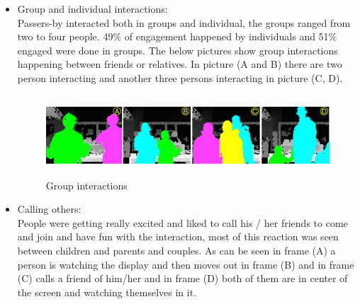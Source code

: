 \begin{enumerate}
\begin{itemize}
\item Group and individual interactions: \\
Passers-by interacted both in groups and individual, the groups ranged from two to four people. 49\% of engagement happened by individuals and 51\% engaged were done in groups. 
The below pictures show group interactions happening between friends or relatives. In picture (A and B) there are two person interacting and another three persons interacting in picture (C, D).


\begin{minipage}{0.89\textwidth}
\begin{flushright}
\begin{figure}[H]
    \centering
    \includegraphics[width=\textwidth,height=30mm]{Figures/8/body_inter_findings/effects/group}
    \caption{Group interactions}
    \label{fig:group_interaction}
\end{figure}
\end{flushright}
\end{minipage}







\item Calling others: \\
People were getting really excited and liked to call his / her friends to come and join and have fun with the interaction, most of this reaction was seen between children and parents and couples. As can be seen in frame (A) a person is watching the display and then moves out in frame (B) and in frame (C) calls a friend of him/her and in frame (D) both of them are in center of the screen and watching themselves in it.


\end{itemize}
\end{enumerate}
